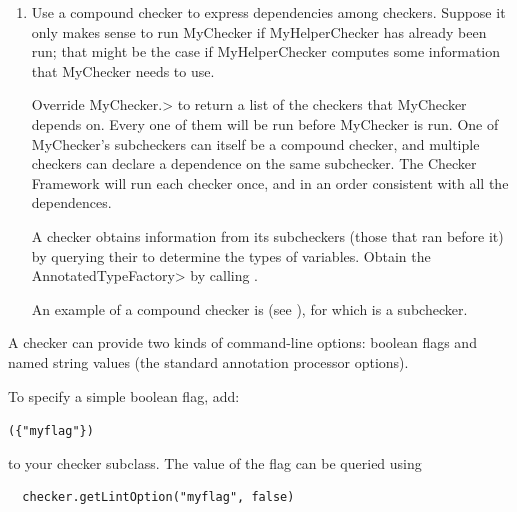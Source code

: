 \begin{enumerate}
\item
Use a compound checker to express dependencies among checkers.  Suppose it
only makes sense to run MyChecker if MyHelperChecker has already been run;
that might be the case if MyHelperChecker computes some information that
MyChecker needs to use.

Override
\<MyChecker.>
to return a list of the checkers that MyChecker depends on.  Every one of
them will be run before MyChecker is run.  One of MyChecker's subcheckers
can itself be a compound checker, and multiple checkers can declare a
dependence on the same subchecker.  The Checker Framework will run each
checker once, and in an order consistent with all the dependences.

A checker obtains information from its subcheckers (those that ran before
it) by querying their  to
determine the types of variables.  Obtain the \<AnnotatedTypeFactory> by
calling
.

An example of a compound checker is
(see ), for which 
is a subchecker.
\end{enumerate}




A checker can provide two kinds of command-line options:
boolean flags and
named string values (the standard annotation processor
options).


To specify a simple boolean flag, add:

\begin{alltt}
  (\{"myflag"\})
\end{alltt}

\noindent
to your checker subclass.
The value of the flag can be queried using

\begin{Verbatim}
  checker.getLintOption("myflag", false)
\end{Verbatim}

